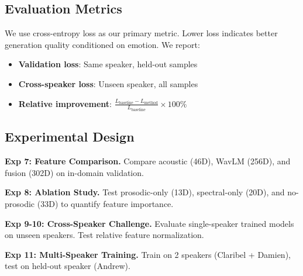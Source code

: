 \subsection{Evaluation Metrics}

We use cross-entropy loss as our primary metric. Lower loss indicates better generation quality conditioned on emotion. We report:
\begin{itemize}
    \item \textbf{Validation loss}: Same speaker, held-out samples
    \item \textbf{Cross-speaker loss}: Unseen speaker, all samples
    \item \textbf{Relative improvement}: $\frac{L_{\text{baseline}} - L_{\text{method}}}{L_{\text{baseline}}} \times 100\%$
\end{itemize}

\subsection{Experimental Design}

\textbf{Exp 7: Feature Comparison.} Compare acoustic (46D), WavLM (256D), and fusion (302D) on in-domain validation.

\textbf{Exp 8: Ablation Study.} Test prosodic-only (13D), spectral-only (20D), and no-prosodic (33D) to quantify feature importance.

\textbf{Exp 9-10: Cross-Speaker Challenge.} Evaluate single-speaker trained models on unseen speakers. Test relative feature normalization.

\textbf{Exp 11: Multi-Speaker Training.} Train on 2 speakers (Claribel + Damien), test on held-out speaker (Andrew).
